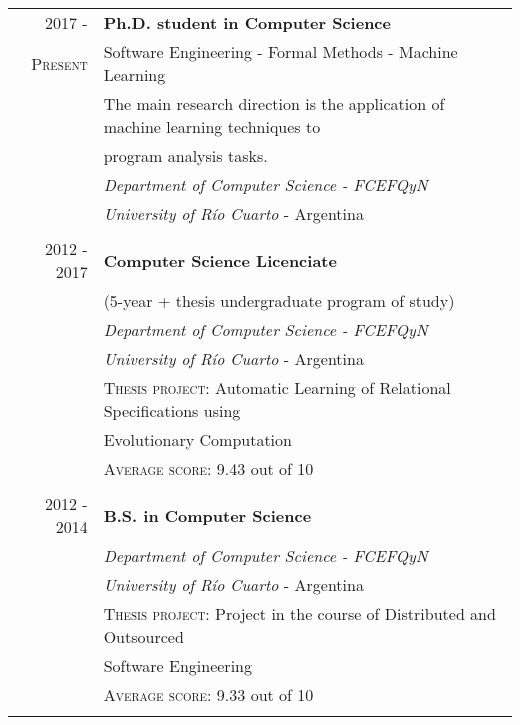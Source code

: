 \documentclass[a4paper,10pt]{article} %
\begin{document}
\begin{tabular}{rl}
\\
\textsc{2017 -}	& \textbf{Ph.D. student in Computer Science} \\
\textsc{Present}  & Software Engineering - Formal Methods - Machine Learning \\
& The main research direction is the application of machine learning techniques to \\ 
& program analysis tasks. \\
& \textit{Department of Computer Science - FCEFQyN} \\ & \textit{University of Río Cuarto} - Argentina \\ & \\

\textsc{2012 - 2017}	& \textbf{Computer Science Licenciate} \\
& (5-year + thesis undergraduate program of study) \\
& \textit{Department of Computer Science - FCEFQyN} \\ & \textit{University of Río Cuarto} - Argentina \\ 
& \textsc{Thesis project:} Automatic Learning of Relational Specifications using \\ 
& Evolutionary Computation \\ 
& \textsc{Average score:} 9.43 out of 10 \\ & \\

\textsc{2012 - 2014}	& \textbf{B.S. in Computer Science} \\
& \textit{Department of Computer Science - FCEFQyN} \\ 
& \textit{University of Río Cuarto} - Argentina \\
& \textsc{Thesis project:} Project in the course of Distributed and Outsourced \\ 
& Software Engineering \\ 
& \textsc{Average score:} 9.33 out of 10 \\ \\ 

\end{tabular}
\end{document}
